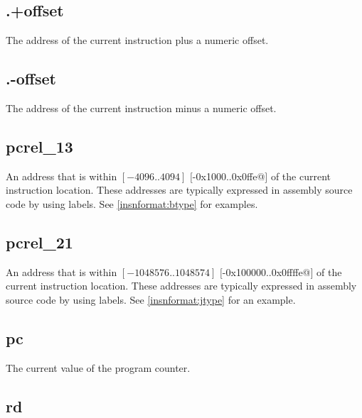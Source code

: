 \subsection{.+offset}

The address of the current instruction plus a numeric offset.

\subsection{.-offset}

The address of the current instruction minus a numeric offset.

\subsection{pcrel\_13}
\label{pcrel.13}

An address that is within $[-4096..4094]$ $[$\verb@-0x1000..0x0ffe@$]$ of the current instruction location.
These addresses are typically expressed in assembly source code by using labels.
See \autoref{insnformat:btype} for examples.

\subsection{pcrel\_21}
\label{pcrel.21}

An address that is within $[-1048576..1048574]$ $[$\verb@-0x100000..0x0ffffe@$]$ of the current instruction 
location.  
These addresses are typically expressed in assembly source code by using labels.
See \autoref{insnformat:jtype} for an example.


\subsection{pc}

The current value of the program counter.

\subsection{rd}

